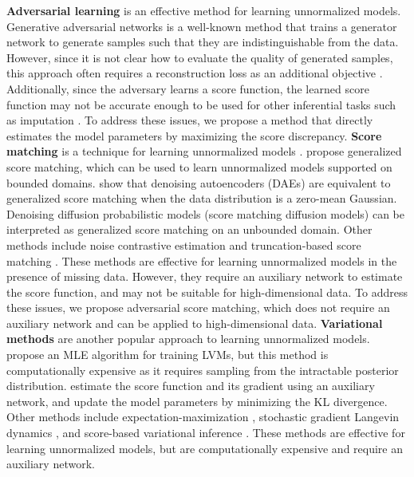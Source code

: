 \textbf{Adversarial learning} is an effective method for learning unnormalized models. Generative adversarial networks \citep{Goodfellow2014a, Huszar2017} is a well-known method that trains a generator network to generate samples such that they are indistinguishable from the data. However, since it is not clear how to evaluate the quality of generated samples, this approach often requires a reconstruction loss as an additional objective \citep{Li2015, Li2017a, Binkowski2018}. Additionally, since the adversary learns a score function, the learned score function may not be accurate enough to be used for other inferential tasks such as imputation \citep{Uehara2020}. To address these issues, we propose a method that directly estimates the model parameters by maximizing the score discrepancy.
\textbf{Score matching} is a technique for learning unnormalized models \citep{Hyvarinen2005, Hyvarinen2007, Song2019}. \citet{Hyvarinen2007} propose generalized score matching, which can be used to learn unnormalized models supported on bounded domains. \citet{Vincent2011, Swersky2011} show that denoising autoencoders (DAEs) are equivalent to generalized score matching when the data distribution is a zero-mean Gaussian. Denoising diffusion probabilistic models (score matching diffusion models) \citep{Ho2020} can be interpreted as generalized score matching on an unbounded domain. Other methods include noise contrastive estimation \citep{Gutmann2010, Ma2018} and truncation-based score matching \citep{Liu2022}. These methods are effective for learning unnormalized models in the presence of missing data. However, they require an auxiliary network to estimate the score function, and may not be suitable for high-dimensional data. To address these issues, we propose adversarial score matching, which does not require an auxiliary network and can be applied to high-dimensional data.
\textbf{Variational methods} are another popular approach to learning unnormalized models. \citet{Vertes2016} propose an MLE algorithm for training LVMs, but this method is computationally expensive as it requires sampling from the intractable posterior distribution. \citet{Bao2020, Bao2021} estimate the score function and its gradient using an auxiliary network, and update the model parameters by minimizing the KL divergence. Other methods include expectation-maximization \citep{Dempster1977, Matsuda2021}, stochastic gradient Langevin dynamics \citep{Matsuda2021}, and score-based variational inference \citep{Ranganath2014, Ranganath2016}. These methods are effective for learning unnormalized models, but are computationally expensive and require an auxiliary network.
